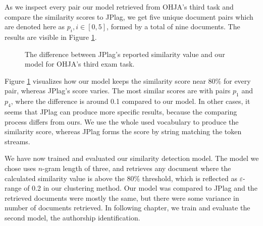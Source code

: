 As we inspect every pair our model retrieved from OHJA's third task and compare the similarity scores to JPlag, we get five unique document pairs which are denoted here as $p_i, i \in [0, 5]$, formed by a total of nine documents. The results are visible in Figure \ref{fig-jplag-sd-ohja3}.

\begin{figure}[ht]
    \centering
    \setlength\figureheight{5cm}
    \setlength{}
    
    \caption{The difference between JPlag's reported similarity value and our model for OHJA's third exam task.}
    \label{fig-jplag-sd-ohja3}
\end{figure}

\noindent
Figure \ref{fig-jplag-sd-ohja3} visualizes how our model keeps the similarity score near 80\% for every pair, whereas JPlag's score varies. The most similar scores are with pairs $p_1$ and $p_4$, where the difference is around 0.1 compared to our model. In other cases, it seems that JPlag can produce more specific results, because the comparing process differs from ours. We use the whole used vocabulary to produce the similarity score, whereas JPlag forms the score by string matching the token streams. 

We have now trained and evaluated our similarity detection model. The model we chose uses $n$-gram length of three, and retrieves any document where the calculated similarity value is above the 80\% threshold, which is reflected as $\varepsilon$-range of 0.2 in our clustering method. Our model was compared to JPlag and the retrieved documents were mostly the same, but there were some variance in number of documents retrieved. In following chapter, we train and evaluate the second model, the authorship identification.




